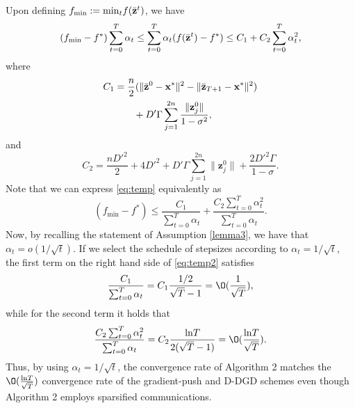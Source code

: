 Upon defining $f_{\min}:=\mathrm{min}_t f(\Bar{\mathbf{z}}^t)$, we have
\begin{equation}\label{eq:temp}
(f_{\min}-f^*)\sum_{t=0}^T\alpha_t \leq \sum_{t=0}^T\alpha_t(f(\Bar{\mathbf{z}}^t)-f^* )
\leq C_1+C_2\sum_{t=0}^T\alpha_t^2,
\end{equation}
where 
\begin{equation}
\begin{aligned}
C_1&=\frac{n}{2}(\|\Bar{\mathbf{z}}^0-\mathbf{x}^*\|^2-\|\Bar{\mathbf{z}}_{T+1}-\mathbf{x}^* \|^2)\\
&\qquad+D'\Gamma \sum_{j=1}^{2n}\frac{\|\mathbf{z}_j^0\|}{1-\sigma^2},
\end{aligned}
\end{equation}
and
\begin{equation}
C_2=\frac{nD'^2}{2}+4D'^2+D'\Gamma \sum_{j=1}^{2n}\|\mathbf{z}_j^0\|+\frac{2D'^2\Gamma}{1-\sigma}.
\end{equation}
Note that we can express \eqref{eq:temp} equivalently as
\begin{equation}\label{eq:temp2}
(f_{\min}-f^*)\leq \frac{C_1}{\sum_{t=0}^T\alpha_t}+\frac{C_2 \sum_{t=0}^T\alpha_t^2}{\sum_{t=0}^T\alpha_t}.
\end{equation}
Now, by recalling the statement of Assumption \ref{lemma3}, we have that $\alpha_t=o(1/\sqrt{t})$. If we select the schedule of stepsizes according to $\alpha_t=1/\sqrt{t}$, the first term on the right hand side of \eqref{eq:temp2} satisfies 
\begin{equation}
   \frac{C_1}{\sum_{t=0}^T\alpha_t} = C_1 \frac{1/2}{\sqrt{T}-1}=\O(\frac{1}{\sqrt{T}}),
\end{equation}
while for the second term it holds that
\begin{equation}
    \frac{C_2 \sum_{t=0}^T\alpha_t^2}{\sum_{t=0}^T\alpha_t}=C_2 \frac{\mathrm{ln}T}{2(\sqrt{T}-1)}=\O(\frac{\mathrm{ln}T}{\sqrt{T}}). 
\end{equation}
Thus, by using $\alpha_t=1/\sqrt{t}$, the convergence rate of Algorithm 2 matches the $\O(\frac{\mathrm{ln}T}{\sqrt{T}})$ convergence rate of the gradient-push and D-DGD schemes \cite{nedic2014distributed,xi2017distributed} even though Algorithm 2 employs sparsified communications.